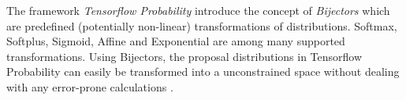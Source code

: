 The framework \textit{Tensorflow Probability} introduce the concept of \textit{Bijectors} which are predefined (potentially non-linear) transformations of distributions. Softmax, Softplus, Sigmoid, Affine and Exponential are among many supported transformations. Using Bijectors, the proposal distributions in Tensorflow Probability can easily be transformed into a unconstrained space without dealing with any error-prone calculations \cite{tensorflow2015-whitepaper}. 


